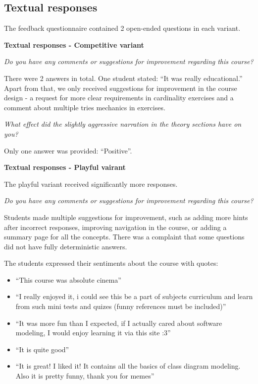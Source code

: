 \subsection{Textual responses}

The feedback questionnaire contained 2 open-ended questions in each variant. 

\textbf{Textual responses - Competitive variant}

\textit{Do you have any comments or suggestions for improvement regarding this course?}

There were 2 answers in total. One student stated: \enquote{It was really educational.} Apart from that, we only received suggestions for improvement in the course design - a request for more clear requirements in cardinality exercises and a comment about multiple tries mechanics in exercises.

\textit{What effect did the slightly aggressive narration in the theory sections have on you?}

Only one answer was provided: \enquote{Positive}.

\textbf{Textual responses - Playful vairant}

The playful variant received significantly more responses. 

\textit{Do you have any comments or suggestions for improvement regarding this course?}

Students made multiple suggestions for improvement, such as adding more hints after incorrect responses, improving navigation in the course, or adding a summary page for all the concepts. There was a complaint that some questions did not have fully deterministic answers.

The students expressed their sentiments about the course with quotes:

\begin{itemize}
    \item \enquote{This course was absolute cinema}
    \item \enquote{I really enjoyed it, i could see this be a part of subjects curriculum and learn from such mini tests and quizes (funny references must be included)}
    \item \enquote{It was more fun than I expected, if I actually cared about software modeling, I would enjoy learning it via this site :3}
    \item \enquote{It is quite good}
    \item \enquote{It is great! I liked it! It contains all the basics of class diagram modeling. Also it is pretty funny, thank you for memes}
\end{itemize}


